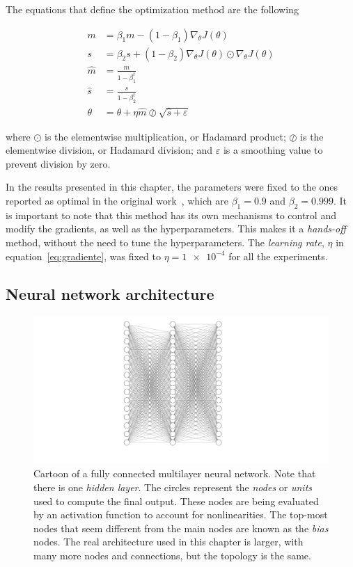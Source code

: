 The equations that define the optimization method are the following

\begin{align}
    m &= \beta_1 m - (1 - \beta_1) \nabla_{\theta} J(\theta) \nonumber \\
    s &= \beta_2 s + (1 - \beta_2) \nabla_{\theta} J(\theta) \odot \nabla_{\theta} J(\theta) \nonumber \\
    \hat{m} &= \frac{m}{1 - \beta_1^t} \nonumber \\
    \hat{s} &= \frac{s}{1 - \beta_2^t} \nonumber \\
    \theta &= \theta + \eta \hat{m} \oslash \sqrt{\hat{s} + \varepsilon}
    \label{eq:adam}
\end{align}

where $\odot$ is the elementwise multiplication, or Hadamard product; $\oslash$
is the elementwise division, or Hadamard division; and $\varepsilon$ is a smoothing
value to prevent division by zero.

In the results presented in this chapter, the parameters were fixed to the ones reported
as optimal in the original work~\cite{kingmaAdamMethodStochastic2017}, which are
$\beta_1=\num{0.9}$ and $\beta_2=\num{0.999}$. It is important to note that this method
has its own mechanisms to control and modify the gradients, as well as the hyperparameters.
This makes it a \emph{hands-off} method, without the need to tune the hyperparameters.
The \emph{learning rate}, $\eta$ in equation~\eqref{eq:gradiente}, was fixed to
$\eta=\num{1e-4}$ for all the experiments.

\subsection{Neural network architecture}

\begin{figure}[t]
    \includegraphics[width=\textwidth]{figuras/capitulo-3/neural-network.pdf}
    \vspace{-1.5cm}
    \caption[General schematics of a neural network.]{Cartoon of a fully connected multilayer neural network. Note that there is one \emph{hidden layer}. The circles represent the \emph{nodes} or \emph{units} used to compute the final output. These nodes are being evaluated by an activation function to account for nonlinearities. The top-most nodes that seem different from the main nodes are known as the \emph{bias} nodes. The real architecture used in this chapter is larger, with many more nodes and connections, but the topology is the same.}
    \label{fig:nn-esquema}
\end{figure}

